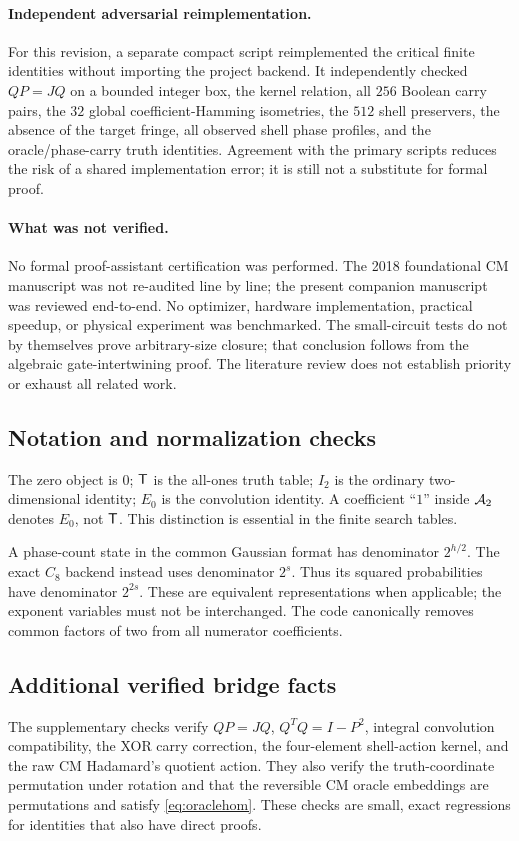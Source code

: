 \paragraph{Independent adversarial reimplementation.}
For this revision, a separate compact script reimplemented the critical finite identities without importing the project backend.  It independently checked $QP=JQ$ on a bounded integer box, the kernel relation, all $256$ Boolean carry pairs, the $32$ global coefficient-Hamming isometries, the $512$ shell preservers, the absence of the target fringe, all observed shell phase profiles, and the oracle/phase-carry truth identities.  Agreement with the primary scripts reduces the risk of a shared implementation error; it is still not a substitute for formal proof.

\paragraph{What was not verified.}
No formal proof-assistant certification was performed. The 2018 foundational CM manuscript was not re-audited line by line; the present companion manuscript was reviewed end-to-end. No optimizer, hardware implementation, practical speedup, or physical experiment was benchmarked. The small-circuit tests do not by themselves prove arbitrary-size closure; that conclusion follows from the algebraic gate-intertwining proof. The literature review does not establish priority or exhaust all related work.

\subsection{Notation and normalization checks}
The zero object is $0$; $\mathsf T$ is the all-ones truth table; $I_2$ is the ordinary two-dimensional identity; $E_0$ is the convolution identity. A coefficient ``$1$'' inside $\mathcal A_2$ denotes $E_0$, not $\mathsf T$. This distinction is essential in the finite search tables.

A phase-count state in the common Gaussian format has denominator $2^{h/2}$. The exact $C_8$ backend instead uses denominator $2^s$. Thus its squared probabilities have denominator $2^{2s}$. These are equivalent representations when applicable; the exponent variables must not be interchanged. The code canonically removes common factors of two from all numerator coefficients.

\subsection{Additional verified bridge facts}
The supplementary checks verify $QP=JQ$, $Q^TQ=I-P^2$, integral convolution compatibility, the XOR carry correction, the four-element shell-action kernel, and the raw CM Hadamard's quotient action. They also verify the truth-coordinate permutation under rotation and that the reversible CM oracle embeddings are permutations and satisfy \cref{eq:oraclehom}. These checks are small, exact regressions for identities that also have direct proofs.

